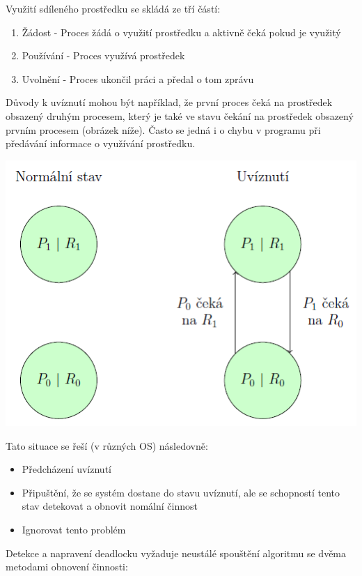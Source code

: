 Využití sdíleného prostředku se skládá ze tří částí:
\begin{enumerate}
    \item Žádost - Proces žádá o využití prostředku a aktivně čeká pokud je využitý
    \item Používání - Proces využívá prostředek
    \item Uvolnění - Proces ukončil práci a předal o tom zprávu
\end{enumerate}

Důvody k uvíznutí mohou být například, že první proces čeká na prostředek obsazený druhým procesem, který je také ve stavu čekání na prostředek obsazený prvním procesem (obrázek níže). Často se jedná i o chybu v programu při předávání informace o využívání prostředku.

\begin{center}
    \includegraphics[scale=1]{images/proc_deadlock.png}
\end{center}

Tato situace se řeší (v různých OS) následovně:
\begin{itemize}
    \item Předcházení uvíznutí
    \item Připuštění, že se systém dostane do stavu uvíznutí, ale se schopností tento stav detekovat a obnovit nomální činnost
    \item Ignorovat tento problém
\end{itemize}

Detekce a napravení deadlocku vyžaduje neustálé spouštění algoritmu se dvěma metodami obnovení činnosti:

